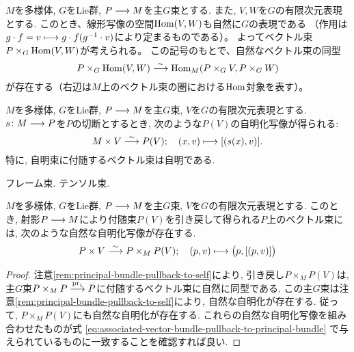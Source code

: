 \begin{thm}
  \label{thm:hom-between-associated-bundles}
  $M$を多様体, $G$をLie群, $P \longrightarrow M$を主$G$束とする.
  また, $V,W$を$G$の有限次元表現とする.
  このとき、線形写像の空間$\operatorname{Hom}(V,W)$も自然に$G$の表現である
  （作用は$g\cdot f = v \longmapsto g\cdot f(g^{-1}\cdot v)$により定まるものである）。
  よってベクトル束$P\times_G \operatorname{Hom}(V,W)$が考えられる。
  この記号のもとで、自然なベクトル束の同型
  \begin{equation}
    P\times_G \operatorname{Hom}(V,W) \stackrel{\sim}{\longrightarrow} \operatorname{Hom}_M(P\times_G V,P\times_G W)
  \end{equation}
  が存在する（右辺は$M$上のベクトル束の圏における$\operatorname{Hom}$対象を表す）。
\end{thm}

\begin{rem}
$M$を多様体, $G$をLie群, $P \longrightarrow M$を主$G$束, $V$を$G$の有限次元表現とする.
$s \colon M \longrightarrow P$を$P$の切断とするとき, 次のような$P(V)$の自明化写像が得られる:
\begin{equation}
M \times V \stackrel{\sim}{\longrightarrow} P(V); \quad (x, v) \longmapsto [(s(x), v)].
\end{equation}
特に, 自明束に付随するベクトル束は自明である.
\end{rem}

\begin{exa}
フレーム束.
テンソル束.
\end{exa}

\begin{thm}
\label{pullback-of-associated-bundle-to-total-space-is-trivial}
$M$を多様体, $G$をLie群, $P \longrightarrow M$を主$G$束, $V$を$G$の有限次元表現とする.
このとき,
射影$P \longrightarrow M$により付随束$P(V)$を引き戻して得られる$P$上のベクトル束には,
次のような自然な自明化写像が存在する.
\begin{equation}
\label{eq:associated-vector-bundle-pullback-to-principal-bundle}
P \times V \stackrel{\sim}{\longrightarrow} P \times_M P(V); \quad (p, v) \longmapsto \bigl(p, [(p, v)]\bigr)
\end{equation}
\end{thm}

\begin{proof}
注意\ref{rem:principal-bundle-pullback-to-self}により, 引き戻し$P \times_M P(V)$は,
主$G$束$P \times_M P \stackrel{\operatorname{pr}_1}{\longrightarrow} P$に付随するベクトル束に自然に同型である.
この主$G$束は注意\ref{rem:principal-bundle-pullback-to-self}により, 自然な自明化が存在する.
従って, $P \times_M P(V)$にも自然な自明化が存在する.
これらの自然な自明化写像を組み合わせたものが式
\ref{eq:associated-vector-bundle-pullback-to-principal-bundle}
で与えられているものに一致することを確認すれば良い.
\end{proof}

